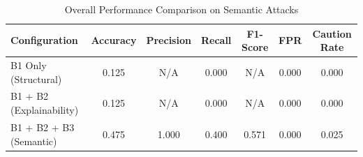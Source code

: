 \begin{table}[h]
\centering
\caption{Overall Performance Comparison on Semantic Attacks}
\label{tab:semantic_results}
\begin{tabular}{lcccccc}
\hline
\textbf{Configuration} & \textbf{Accuracy} & \textbf{Precision} & \textbf{Recall} & \textbf{F1-Score} & \textbf{FPR} & \textbf{Caution Rate} \\ \hline
B1 Only (Structural) & 0.125 & N/A & 0.000 & N/A & 0.000 & 0.000 \\
B1 + B2 (Explainability) & 0.125 & N/A & 0.000 & N/A & 0.000 & 0.000 \\
B1 + B2 + B3 (Semantic) & 0.475 & 1.000 & 0.400 & 0.571 & 0.000 & 0.025 \\
\hline
\end{tabular}
\end{table}
